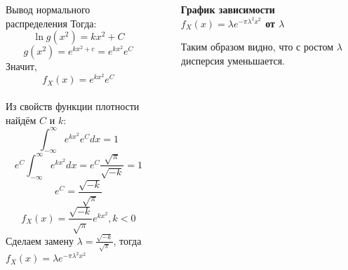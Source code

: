 \begin{frame}[t]
\begin{columns}[t]
\begin{column}{.465\textwidth}
\begin{block}{\large{Вывод нормального распределения}}
Тогда:
\[ \ln g(x^2) = kx^2+C\]
\[g(x^2)=e^{kx^2+c}=e^{kx^2}e^C\]
Значит,
\[f_X(x)=e^{kx^2}e^C\]
\vspace{0.05 in} 
\\
Из свойств функции плотности найдём $C$ и $k$:
\[ \int_{-\infty}^{\infty} e^{kx^2}e^C dx= 1\]
\[e^C   \int_{-\infty}^{\infty} e^{kx^2} dx= e^C \frac{\sqrt{\pi}}{\sqrt{-k}}=1 \]
\[e^C = \frac{\sqrt{-k}}{\sqrt{\pi}}\]
\[f_X(x)=\frac{\sqrt{-k}}{\sqrt{\pi}} e^{kx^2}, k<0\]
Сделаем замену $\lambda = \frac{\sqrt{-k}}{\sqrt{\pi}}$, тогда $f_X(x)=\lambda e^{-\pi{\lambda}^2x^2}$
\vspace{0.4 in} 
\\






\end{block}

\end{column} %

\begin{column}{.03\textwidth}\end{column} %

\begin{column}{.465\textwidth} %



\begin{tcolorbox}[colback = beaublue]
\begin{center}
  

\textbf{График зависимости $f_X(x) = \lambda e^{-\pi \lambda^2 x^2}$ от $\lambda$ }
\end{center}
\end{tcolorbox}

\vspace{2.5cm}
\begin{tikzpicture}
	
\end{tikzpicture}

Таким образом видно, что с ростом $\lambda$ дисперсия уменьшается.


\end{column}
\end{columns}
\end{frame}

